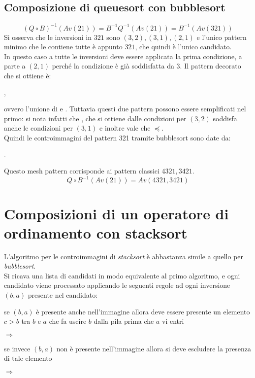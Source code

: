 \subsection{Composizione di queuesort con bubblesort}
$$(Q\circ B)^{-1}(Av(21))=B^{-1}Q^{-1}(Av(21))=B^{-1}(Av(321))$$
Si osserva che le inversioni in $321$ sono $(3,2),(3,1),(2,1)$ e l'unico pattern minimo che le contiene tutte \`e appunto $321$, che quindi \`e l'unico candidato.\\
In questo caso a tutte le inversioni deve essere applicata la prima condizione, a parte a $(2,1)$ perch\'e la condizione \`e gi\`a soddisfatta da 3. Il pattern decorato che si ottiene \`e:
\begin{center}
,
\end{center}
ovvero  l'unione di  e . Tuttavia questi due pattern possono essere semplificati nel primo: si nota infatti che , che si ottiene dalle condizioni per $(3,2)$ soddisfa anche le condizioni per $(3,1)$ e inoltre vale che $\preceq$.\\
Quindi le controimmagini del pattern 321 tramite bubblesort sono date da:
\begin{center}
.
\end{center}
Questo mesh pattern corrisponde ai pattern classici $4321,3421$.$$Q\circ B^{-1}(Av(21))=Av(4321,3421)$$
\section{Composizioni di un operatore di ordinamento con stacksort}
L'algoritmo per le controimmagini di \textit{stacksort} \`e abbastanza simile a quello per \textit{bubblesort}.\\
Si ricava una lista di candidati in modo equivalente al primo algoritmo, e ogni candidato viene processato applicando le seguenti regole ad ogni inversione $(b,a)$ presente nel candidato:
\begin{description}
\item se $(b,a)$ \`e presente anche nell'immagine allora deve essere presente un elemento $c>b$ tra $b$ e $a$ che fa uscire $b$ dalla pila prima che $a$ vi entri
\begin{center}
 $\Longrightarrow$ 
\end{center}
\item se invece $(b,a)$ non \`e presente nell'immagine allora si deve escludere la presenza di tale elemento
\begin{center}
 $\Longrightarrow$ 
\end{center}
\end{description}
